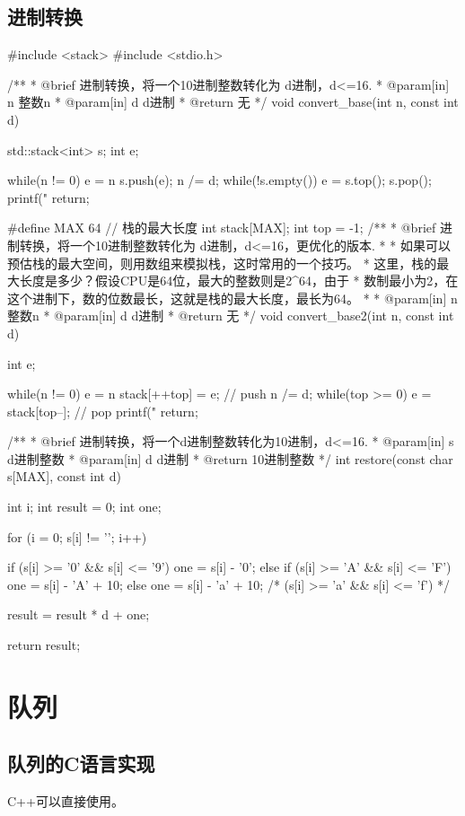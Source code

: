 \subsection{进制转换}
\begin{Codex}[label=convert_base.cpp]
#include <stack>
#include <stdio.h>

 /**
  * @brief 进制转换，将一个10进制整数转化为 d进制，d<=16.
  * @param[in] n 整数n
  * @param[in] d d进制
  * @return 无
  */
void convert_base(int n, const int d) {
    std::stack<int> s;
    int e;

    while(n != 0) {
        e = n %
        s.push(e);
        n /= d;
    }
    while(!s.empty()) {
        e = s.top();
        s.pop();
        printf("%
    }
    return;
}

#define MAX 64 // 栈的最大长度
int stack[MAX];
int top = -1;
/**
 * @brief 进制转换，将一个10进制整数转化为 d进制，d<=16，更优化的版本.
 *
 * 如果可以预估栈的最大空间，则用数组来模拟栈，这时常用的一个技巧。
 * 这里，栈的最大长度是多少？假设CPU是64位，最大的整数则是2^64，由于
 * 数制最小为2，在这个进制下，数的位数最长，这就是栈的最大长度，最长为64。
 *
 * @param[in] n 整数n
 * @param[in] d d进制
 * @return 无
 */
void convert_base2(int n, const int d) {
    int e;

    while(n != 0) {
        e = n %
        stack[++top] = e; // push
        n /= d;
    }
    while(top >= 0) {
        e = stack[top--]; // pop
        printf("%
    }
    return;
}


/**
 * @brief 进制转换，将一个d进制整数转化为10进制，d<=16.
 * @param[in] s d进制整数
 * @param[in] d d进制
 * @return 10进制整数
 */
int restore(const char s[MAX], const int d) {
    int i;
    int result = 0;
    int one;

    for (i = 0; s[i] != '\0'; i++) {
        if (s[i] >= '0' && s[i] <= '9') one = s[i] - '0';
        else if (s[i] >= 'A' && s[i] <= 'F') one = s[i] - 'A' + 10;
        else one = s[i] - 'a' + 10; /* (s[i] >= 'a' && s[i] <= 'f') */
        
        result = result * d + one;
    }
    return result;
}
\end{Codex}

\section{队列} %

\subsection{队列的C语言实现}
C++可以直接使用。

